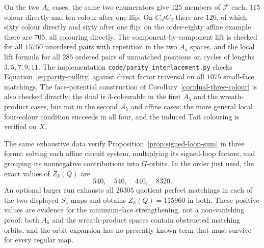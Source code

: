 \documentclass[11pt,a4paper]{article}
\theoremstyle{definition}
\theoremstyle{remark}
\begin{document}
On the two $A_5$ cases, the same two enumerators give $125$ members of $\mathcal F$ each: $115$ colour directly and ten colour after one flip.  On $C_5\wr C_2$ there are $120$, of which sixty colour directly and sixty after one flip; on the order-eighty affine example there are $705$, all colouring directly.  The component-by-component lift is checked for all $15750$ unordered pairs with repetition in the two $A_5$ spaces, and the local lift formula for all $285$ ordered pairs of unmatched positions on cycles of lengths $3,5,7,9,11$.  The implementation \nolinkurl{code/parity_interlacement.py} checks Equation~\eqref{eq:parity-nullity} against direct factor traversal on all $1075$ small-face matchings.  The face-potential construction of Corollary~\ref{cor:dual-three-colour} is also checked directly: the dual is $3$-colourable in the first $A_5$ and the wreath-product cases, but not in the second $A_5$ and affine cases; the more general local four-colour condition succeeds in all four, and the induced Tait colouring is verified on $X$.

The same exhaustive data verify Proposition~\ref{prop:signed-loop-sum} in three forms: solving each affine circuit system, multiplying its signed-loop factors, and grouping its nonnegative contributions into $G$-orbits.  In the order just used, the exact values of $Z_k(Q)$ are
\[
 540,\quad 540,\quad 440,\quad 8320.
\]
An optional larger run exhausts all $26305$ quotient perfect matchings in each of the two displayed $S_5$ maps and obtains $Z_k(Q)=115960$ in both.  These positive values are evidence for the minimum-face strengthening, not a non-vanishing proof: both $A_5$ and the wreath-product spaces contain obstructed matching orbits, and the orbit expansion has no presently known term that must survive for every regular map.
\end{document}
